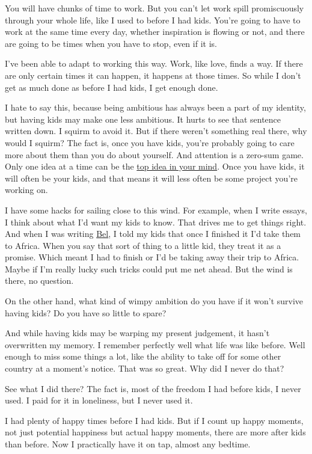 You will have chunks of time to work. But you can't let work spill
promiscuously through your whole life, like I used to before I had kids.
You're going to have to work at the same time every day, whether
inspiration is flowing or not, and there are going to be times when you
have to stop, even if it is.

I've been able to adapt to working this way. Work, like love, finds a
way. If there are only certain times it can happen, it happens at those
times. So while I don't get as much done as before I had kids, I get
enough done.

I hate to say this, because being ambitious has always been a part of my
identity, but having kids may make one less ambitious. It hurts to see
that sentence written down. I squirm to avoid it. But if there weren't
something real there, why would I squirm? The fact is, once you have
kids, you're probably going to care more about them than you do about
yourself. And attention is a zero-sum game. Only one idea at a time can
be the \href{top.html}{top idea in your mind}. Once you have kids, it
will often be your kids, and that means it will less often be some
project you're working on.

I have some hacks for sailing close to this wind. For example, when I
write essays, I think about what I'd want my kids to know. That drives
me to get things right. And when I was writing \href{bel.html}{Bel}, I
told my kids that once I finished it I'd take them to Africa. When you
say that sort of thing to a little kid, they treat it as a promise.
Which meant I had to finish or I'd be taking away their trip to Africa.
Maybe if I'm really lucky such tricks could put me net ahead. But the
wind is there, no question.

On the other hand, what kind of wimpy ambition do you have if it won't
survive having kids? Do you have so little to spare?

And while having kids may be warping my present judgement, it hasn't
overwritten my memory. I remember perfectly well what life was like
before. Well enough to miss some things a lot, like the ability to take
off for some other country at a moment's notice. That was so great. Why
did I never do that?

See what I did there? The fact is, most of the freedom I had before
kids, I never used. I paid for it in loneliness, but I never used it.

I had plenty of happy times before I had kids. But if I count up happy
moments, not just potential happiness but actual happy moments, there
are more after kids than before. Now I practically have it on tap,
almost any bedtime.

